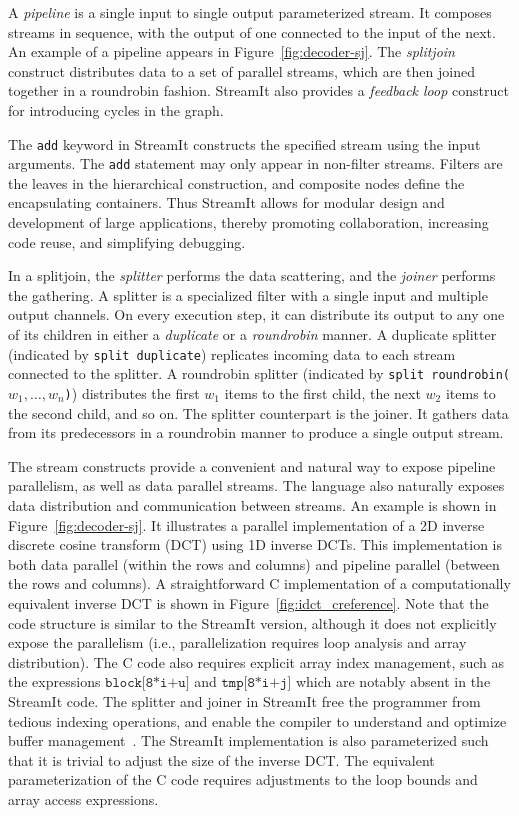 \vspace{-11pt}

A {\it pipeline} is a single input to single output parameterized
stream. It composes streams in sequence, with the output of one
connected to the input of the next.  An example of a pipeline appears
in Figure~\ref{fig:decoder-sj}. The {\it splitjoin} construct
distributes data to a set of parallel streams, which are then joined
together in a roundrobin fashion.  StreamIt also provides a {\it
feedback loop} construct for introducing cycles in the graph.

The {\tt add} keyword in StreamIt constructs the specified stream
using the input arguments. The {\tt add} statement may only appear in
non-filter streams.  Filters are the leaves in the hierarchical
construction, and composite nodes define the encapsulating
containers. Thus StreamIt allows for modular design and development of large
applications, thereby  promoting collaboration, increasing code reuse,
and simplifying debugging.

In a splitjoin, the {\it splitter} performs the data scattering, and
the {\it joiner} performs the gathering. A splitter is a specialized
filter with a single input and multiple output channels. On every
execution step, it can distribute its output to any one of its
children in either a {\it duplicate} or a {\it roundrobin} manner.  A
duplicate splitter (indicated by \texttt{split duplicate}) replicates
incoming data to each stream connected to the splitter.  A roundrobin
splitter (indicated by {\tt split roundrobin($w_1,\ldots,w_n$)})
distributes the first $w_1$ items to the first child, the next $w_2$
items to the second child, and so on.  The splitter counterpart is the
joiner.  It gathers data from its predecessors in a roundrobin manner
to produce a single output stream.

The stream constructs provide a convenient and natural way to expose
pipeline parallelism, as well as data parallel streams. The language
also naturally exposes data distribution and communication between
streams. An example is shown in Figure~\ref{fig:decoder-sj}. It
illustrates a parallel implementation of a 2D inverse discrete cosine
transform (DCT) using 1D inverse DCTs. This implementation is both
data parallel (within the rows and columns) and pipeline parallel
(between the rows and columns).  A straightforward C implementation of
a computationally equivalent inverse DCT is shown in
Figure~\ref{fig:idct_creference}. Note that the code structure is
similar to the StreamIt version, although it does not explicitly
expose the parallelism (i.e., parallelization requires loop analysis
and array distribution).  The C code also requires explicit array
index management, such as the  expressions $\texttt{block[8*i+u]}$ and
$\texttt{tmp[8*i+j]}$ which are notably absent in the StreamIt code.
The splitter and joiner in StreamIt free the programmer from tedious
indexing operations, and enable the compiler to understand and
optimize buffer management~\cite{sermulins05lctes}. The StreamIt
implementation is also parameterized such that it is trivial to adjust
the size of the inverse DCT. The equivalent parameterization of the C
code requires adjustments to the loop bounds and array access
expressions.

